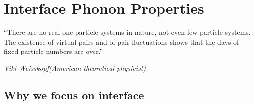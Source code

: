 \chapter{Interface Phonon Properties}


\graphicspath{{Chapter3/}}
\setlength{\epigraphwidth}{0.6\textwidth}
\epigraph{“There are no real one-particle systems in nature, not even few-particle
systems. The existence of virtual pairs and of pair fluctuations shows that
the days of fixed particle numbers are over.”}
{\textit{Viki Weisskopf(American theoretical physicist)}}



\section[Introduction: Why we focus on interface]{Why we focus on interface}
